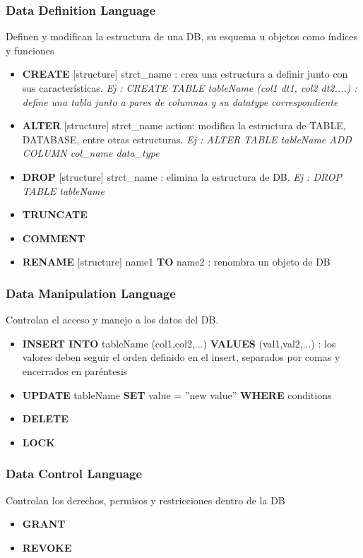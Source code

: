 \subsubsection{Data Definition Language}
Definen y modifican la estructura de una DB, su esquema u objetos como índices y funciones
\begin{itemize}
    \item {\textbf{CREATE} [structure] strct\_name : crea una estructura a definir junto con sus características. \textit{Ej : CREATE TABLE tableName (col1 dt1, col2 dt2....) : define una tabla junto a pares de columnas y su \gls{datatype} correspondiente}}
    \item {\textbf{ALTER} [structure] strct\_name {action}: modifica la estructura de TABLE, DATABASE, entre otras estructuras. \textit{Ej : ALTER TABLE tableName ADD COLUMN col\_name data\_type}}
    \item {\textbf{DROP} [structure] strct\_name :  elimina la estructura de DB. \textit{Ej : DROP TABLE tableName}}
    \item {\textbf{TRUNCATE}}
    \item {\textbf{COMMENT}}
    \item {\textbf{RENAME} [structure] name1 \textbf{TO} name2 : renombra un objeto de DB}
\end{itemize}

\subsubsection{Data Manipulation Language}
Controlan el acceso y manejo a los datos del DB.
\begin{itemize}
    \item {\textbf{INSERT INTO} tableName (col1,col2,...) \textbf{VALUES} (val1,val2,...) : los valores deben seguir el orden definido en el insert, separados por comas y encerrados en paréntesis}
    \item {\textbf{UPDATE} tableName \textbf{SET} value = ''new value'' \textbf{WHERE} {conditions}}
    \item {\textbf{DELETE}}
    \item {\textbf{LOCK}}
\end{itemize}

\subsubsection{Data Control Language}
Controlan los derechos, permisos y restricciones dentro de la DB
\begin{itemize}
    \item {\textbf{GRANT}}
    \item {\textbf{REVOKE}}
\end{itemize}

